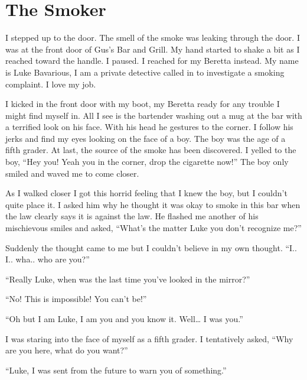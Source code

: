 \chapter{The Smoker}

I stepped up to the door. The smell of the smoke was leaking
through the door. I was at the front door of Gus's Bar and
Grill. My hand started to shake a bit as I reached toward the
handle. I paused. I reached for my Beretta instead. My name is Luke
Bavarious, I am a private detective called in to investigate a
smoking complaint. I love my job.



I kicked in the front door with my boot, my Beretta ready for any
trouble I might find myself in. All I see is the bartender washing
out a mug at the bar with a terrified look on his face. With his
head he gestures to the corner. I follow his jerks and find my eyes
looking on the face of a boy. The boy was the age of a fifth
grader. At last, the source of the smoke has been discovered. I
yelled to the boy, ``Hey you! Yeah you in the corner, drop the
cigarette now!'' The boy only smiled and waved me to come
closer.



As I walked closer I got this horrid feeling that I knew the boy,
but I couldn't quite place it. I asked him why he thought it
was okay to smoke in this bar when the law clearly says it is
against the law. He flashed me another of his mischievous smiles
and asked, ``What's the matter Luke you don't
recognize me?''



Suddenly the thought came to me but I couldn't believe in my
own thought. ``I.. I.. wha.. who are you?''



``Really Luke, when was the last time you've looked in
the mirror?''



``No! This is impossible! You can't be!''



``Oh but I am Luke, I am you and you know it. Well{\ldots} I
was you.''



I was staring into the face of myself as a fifth grader. I
tentatively asked, ``Why are you here, what do you
want?''



``Luke, I was sent from the future to warn you of
something.''



